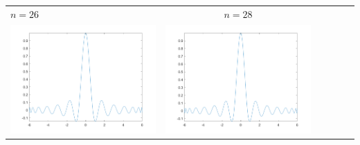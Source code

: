 \begin{tabular}{l*{5}{c}}
\hspace{3.5cm}\(n=26\) &  \(n=28\) \\
\includegraphics[scale=0.5]{cap4/4_7/26.png} &  \includegraphics[scale=0.5]{cap4/4_7/28.png} \\
\end{tabular}

